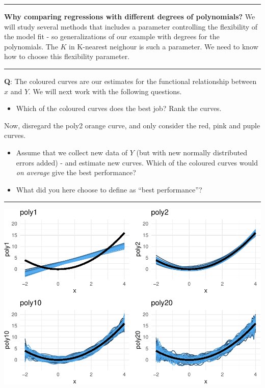 \documentclass[]{article}
\providecommand{\tightlist}{%
  \setlength{\itemsep}{0pt}\setlength{\parskip}{0pt}}
\begin{document}
\begin{center}\rule{0.5\linewidth}{\linethickness}\end{center}

\textbf{Why comparing regressions with different degrees of
polynomials?} We will study several methods that includes a parameter
controlling the flexibility of the model fit - so generalizations of our
example with degrees for the polynomials. The \(K\) in K-nearest
neighour is such a parameter. We need to know how to choose this
flexibility parameter.

\begin{center}\rule{0.5\linewidth}{\linethickness}\end{center}

\textbf{Q}: The coloured curves are our estimates for the functional
relationship between \(x\) and \(Y\). We will next work with the
following questions.

\begin{itemize}
\tightlist
\item
  Which of the coloured curves does the best job? Rank the curves.
\end{itemize}

Now, disregard the poly2 orange curve, and only consider the red, pink
and puple curves.

\begin{itemize}
\tightlist
\item
  Assume that we collect new data of \(Y\) (but with new normally
  distributed errors added) - and estimate new curves. Which of the
  coloured curves would \emph{on average} give the best performance?
\item
  What did you here choose to define as ``best performance''?
\end{itemize}

\begin{center}\rule{0.5\linewidth}{\linethickness}\end{center}

\includegraphics{2StatLearn_files/figure-latex/plottingM-1.pdf}
\end{document}
